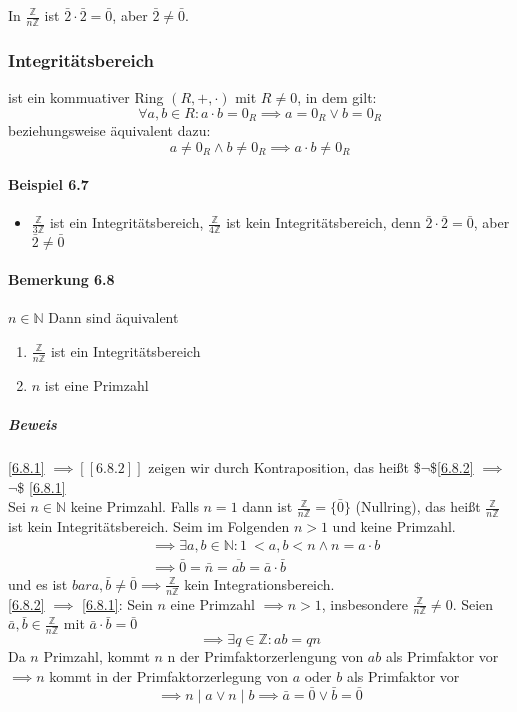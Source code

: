 \documentclass[a4paper]{scrartcl}
\DeclareMathOperator{\Forall}{\forall}
\theoremstyle{definition}
\theoremstyle{plain}
\theoremstyle{plain}
\theoremstyle{remark}
\theoremstyle{remark}
\theoremstyle{remark}
\theoremstyle{remark}
\theoremstyle{remark}
\begin{document}
In $\frac{\mathbb{Z}}{n\mathbb{Z}}$ ist $\bar 2 \cdot \bar 2 = \bar 0$, aber $\bar 2\neq \bar 0$.
\subsubsection{Integritätsbereich}
\label{sec-3-2-5}
\label{Definition-6.6}
ist ein kommuativer Ring $(R,+,\cdot)$ mit $R\neq 0$, in dem gilt:
\[\Forall a,b\in R: a\cdot b = 0_R \implies a = 0_R\vee b = 0_R\]
beziehungsweise äquivalent dazu:
\[a\neq 0_R \wedge b\neq 0_R \implies a\cdot b \neq 0_R\]
\paragraph{Beispiel 6.7}
\label{sec-3-2-5-1}
\begin{itemize}
\item $\frac{\mathbb{Z}}{3\mathbb{Z}}$ ist ein Integritätsbereich, $\frac{\mathbb{Z}}{4\mathbb{Z}}$ ist kein Integritätsbereich, denn $\bar 2\cdot \bar 2 = \bar 0$, aber $\bar 2 \neq \bar 0$
\end{itemize}
\paragraph{Bemerkung 6.8}
\label{sec-3-2-5-2}
$n\in\mathbb{N}$ Dann sind äquivalent
\begin{enumerate}
\item \label{6.8.1} $\frac{\mathbb{Z}}{n\mathbb{Z}}$ ist ein Integritätsbereich
\item \label{6.8.2} $n$ ist eine Primzahl
\end{enumerate}
\subparagraph{Beweis}
\label{sec-3-2-5-2-1}
\ref{6.8.1} $\implies [[6.8.2]]$ zeigen wir durch Kontraposition, das heißt \$$\neg{}$\$\ref{6.8.2} $\implies$ $\neg{}$\$ \ref{6.8.1} \\
      Sei $n\in\mathbb{N}$ keine Primzahl. Falls $n = 1$ dann ist $\frac{\mathbb{Z}}{n\mathbb{Z}} = \{\bar 0\}$ (Nullring), das heißt $\frac{\mathbb{Z}}{n\mathbb{Z}}$ ist kein Integritätsbereich. Seim im Folgenden $n > 1$ und keine Primzahl.
\begin{align}
&\implies \exists a,b\in\mathbb{N}:1\ <a,b<n \wedge n = a\cdot b \\
&\implies \bar 0 = \bar n = \overline{a b} = \bar a \cdot \bar b
\end{align}
und es ist $bar a,\bar b\neq \bar 0 \implies \frac{\mathbb{Z}}{n\mathbb{Z}}$ kein Integrationsbereich. \\
      \ref{6.8.2} $\implies$ \ref{6.8.1}: Sein $n$ eine Primzahl $\implies n > 1$, insbesondere $\frac{\mathbb{Z}}{n\mathbb{Z}} \neq 0$. Seien $\bar a, \bar b \in \frac{\mathbb{Z}}{n\mathbb{Z}}$ mit $\bar a\cdot \bar b = \bar 0$
\[\implies \exists q\in\mathbb{Z}:a b = q n\]
Da $n$ Primzahl, kommt $n$ n der Primfaktorzerlengung von $a b$ als Primfaktor vor \\
      $\implies n$ kommt in der Primfaktorzerlegung von $a$ oder $b$ als Primfaktor vor \[\implies n\mid a \vee n\mid b \implies \bar a = \bar 0 \vee \bar b = \bar 0\]
\end{document}
